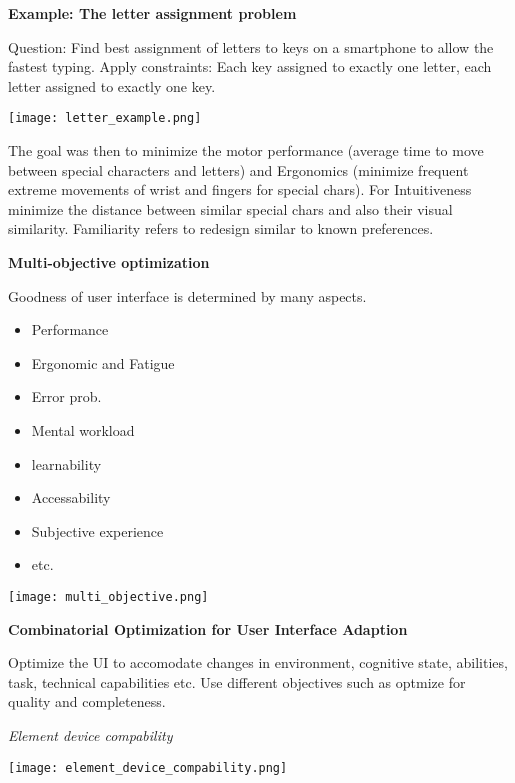 \textbf{Example: The letter assignment problem} \smallskip

Question: Find best assignment of letters to keys on a smartphone to allow the fastest typing. 
Apply constraints: Each key assigned to exactly one letter, each letter assigned to exactly one key. 


\begin{center}
	\texttt{[image: letter\_example.png]}
\end{center}

The goal was then to minimize the motor performance (average time to move between special characters and letters) and Ergonomics (minimize frequent extreme movements of wrist and fingers for special chars).
For Intuitiveness minimize the distance between similar special chars and also their visual similarity. Familiarity refers to redesign similar to known preferences. \medskip

\textbf{Multi-objective optimization} \smallskip

Goodness of user interface is determined by many aspects. 

\begin{itemize}[itemsep=-5pt, topsep=0pt, leftmargin=*]
	\item Performance
	\item Ergonomic and Fatigue
	\item Error prob.
	\item Mental workload
	\item learnability
	\item Accessability
	\item Subjective experience
	\item etc. 
\end{itemize}


\begin{center}
	\texttt{[image: multi\_objective.png]}
\end{center}

\textbf{Combinatorial Optimization for User Interface Adaption} \smallskip

Optimize the UI to accomodate changes in environment, cognitive state, abilities, task, technical capabilities etc. Use different objectives such as optmize for quality and completeness. \smallskip

\textit{Element device compability}

\begin{center}
	\texttt{[image: element\_device\_compability.png]}
\end{center}

